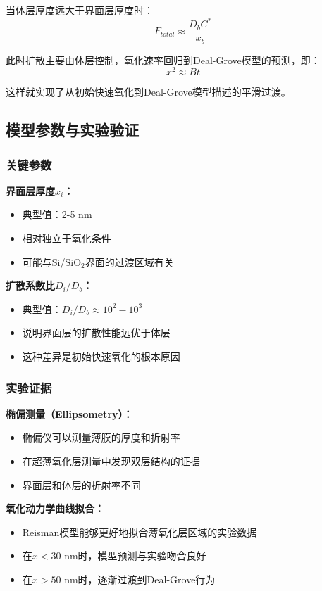 \documentclass[UTF8,12pt,a4paper]{ctexart}
\begin{document}
当体层厚度远大于界面层厚度时：
\begin{equation}
F_{total} \approx \frac{D_b C^*}{x_b}
\end{equation}

此时扩散主要由体层控制，氧化速率回归到Deal-Grove模型的预测，即：
\begin{equation}
x^2 \approx B t
\end{equation}

这样就实现了从初始快速氧化到Deal-Grove模型描述的平滑过渡。

\subsection{模型参数与实验验证}

\subsubsection{关键参数}

\textbf{界面层厚度$x_i$：}
\begin{itemize}
    \item 典型值：2-5 nm
    \item 相对独立于氧化条件
    \item 可能与Si/SiO$_2$界面的过渡区域有关
\end{itemize}

\textbf{扩散系数比$D_i/D_b$：}
\begin{itemize}
    \item 典型值：$D_i/D_b \approx 10^2 - 10^3$
    \item 说明界面层的扩散性能远优于体层
    \item 这种差异是初始快速氧化的根本原因
\end{itemize}

\subsubsection{实验证据}

\textbf{椭偏测量（Ellipsometry）：}
\begin{itemize}
    \item 椭偏仪可以测量薄膜的厚度和折射率
    \item 在超薄氧化层测量中发现双层结构的证据
    \item 界面层和体层的折射率不同
\end{itemize}

\textbf{氧化动力学曲线拟合：}
\begin{itemize}
    \item Reisman模型能够更好地拟合薄氧化层区域的实验数据
    \item 在$x < 30$ nm时，模型预测与实验吻合良好
    \item 在$x > 50$ nm时，逐渐过渡到Deal-Grove行为
\end{itemize}
\end{document}
